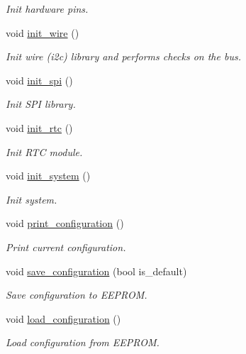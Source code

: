 \begin{DoxyCompactItemize}
\begin{DoxyCompactList}\small\item\em Init hardware pins. \end{DoxyCompactList}\item 
void \hyperlink{i2c-th_8ino_a2441543100bf8421f56edd622a2c1d9a}{init\+\_\+wire} ()
\begin{DoxyCompactList}\small\item\em Init wire (i2c) library and performs checks on the bus. \end{DoxyCompactList}\item 
void \hyperlink{i2c-th_8ino_a8eb9780a3438ec02c70314744f91f3c7}{init\+\_\+spi} ()
\begin{DoxyCompactList}\small\item\em Init S\+PI library. \end{DoxyCompactList}\item 
void \hyperlink{i2c-th_8ino_ab985cc69f5f573113405b4f118c96d33}{init\+\_\+rtc} ()
\begin{DoxyCompactList}\small\item\em Init R\+TC module. \end{DoxyCompactList}\item 
void \hyperlink{i2c-th_8ino_afceb890a6ab9be73cc5481369538c705}{init\+\_\+system} ()
\begin{DoxyCompactList}\small\item\em Init system. \end{DoxyCompactList}\item 
void \hyperlink{i2c-th_8ino_a65b2dadc0411e43874ec8ed7f73bc62a}{print\+\_\+configuration} ()
\begin{DoxyCompactList}\small\item\em Print current configuration. \end{DoxyCompactList}\item 
void \hyperlink{i2c-th_8ino_afa979a8cb238fe81bf20654dfd6096ef}{save\+\_\+configuration} (bool is\+\_\+default)
\begin{DoxyCompactList}\small\item\em Save configuration to E\+E\+P\+R\+OM. \end{DoxyCompactList}\item 
void \hyperlink{i2c-th_8ino_a32a64a2800c724fb28e10636f2ec20b9}{load\+\_\+configuration} ()
\begin{DoxyCompactList}\small\item\em Load configuration from E\+E\+P\+R\+OM. \end{DoxyCompactList}\item 

\end{DoxyCompactItemize}
